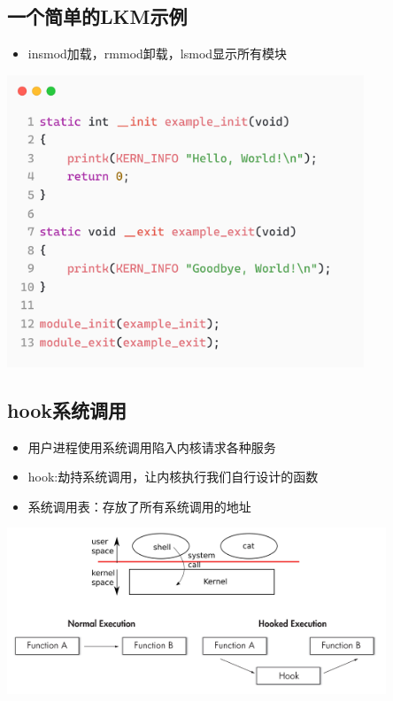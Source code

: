 \documentclass[11pt]{beamer}
\begin{document}
\subsection{一个简单的LKM示例}
\begin{frame}
	\begin{itemize}
		\item insmod加载，rmmod卸载，lsmod显示所有模块
	\end{itemize}
	\begin{itemize}
		\centering
		\includegraphics[width=0.80\textwidth]{pic/lkm-demo.png}
	\end{itemize}
	
\end{frame}

\subsection{hook系统调用}
\begin{frame}
	\begin{itemize}
		\item 用户进程使用系统调用陷入内核请求各种服务
		\item hook:劫持系统调用，让内核执行我们自行设计的函数
		\item 系统调用表：存放了所有系统调用的地址
	\end{itemize}
	\begin{itemize}
		\centering
		\includegraphics[width=0.85\textwidth]{pic/syscall&hook.jpg}
	\end{itemize}
\end{frame}
\end{document}
